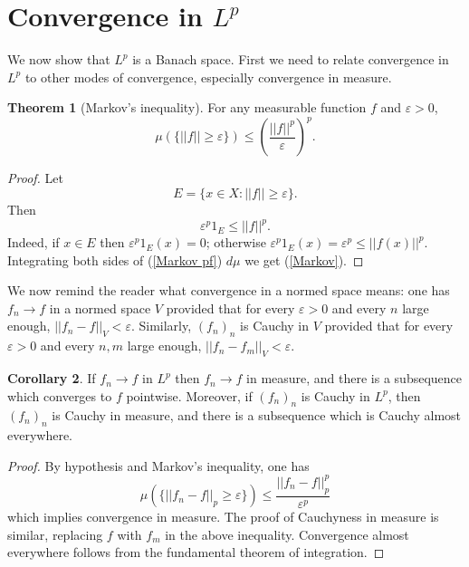 \documentclass[12pt]{book}
\theoremstyle{definition}
\newtheorem{theorem}{Theorem}[section]
\newtheorem{corollary}[theorem]{Corollary}
\begin{document}
\section{Convergence in $L^p$}
We now show that $L^p$ is a Banach space.
First we need to relate convergence in $L^p$ to other modes of convergence, especially convergence in measure.

\begin{theorem}[Markov's inequality]
For any measurable function $f$ and $\varepsilon > 0$,
\begin{equation}
\label{Markov}
\mu(\{||f|| \geq \varepsilon\}) \leq \left(\frac{||f||^p}{\varepsilon}\right)^p.
\end{equation}
\end{theorem}
\begin{proof}
Let
$$E = \{x \in X: ||f|| \geq \varepsilon\}.$$
Then
\begin{equation}
\label{Markov pf}
\varepsilon^p 1_E \leq ||f||^p.
\end{equation}
Indeed, if $x \in E$ then $\varepsilon^p 1_E(x) = 0$; otherwise $\varepsilon^p 1_E(x) = \varepsilon^p \leq ||f(x)||^p$.
Integrating both sides of (\ref{Markov pf}) $d\mu$ we get (\ref{Markov}).
\end{proof}

We now remind the reader what convergence in a normed space means: one has $f_n \to f$ in a normed space $V$ provided that for every $\varepsilon > 0$ and every $n$ large enough, $||f_n - f||_V < \varepsilon$.
Similarly, $(f_n)_n$ is Cauchy in $V$ provided that for every $\varepsilon > 0$ and every $n, m$ large enough, $||f_n - f_m||_V < \varepsilon$.

\begin{corollary}
If $f_n \to f$ in $L^p$ then $f_n \to f$ in measure, and there is a subsequence which converges to $f$ pointwise.
Moreover, if $(f_n)_n$ is Cauchy in $L^p$, then $(f_n)_n$ is Cauchy in measure, and there is a subsequence which is Cauchy almost everywhere.
\end{corollary}
\begin{proof}
By hypothesis and Markov's inequality, one has
$$\mu(\{||f_n - f||_p \geq \varepsilon\}) \leq \frac{||f_n - f||^p_p}{\varepsilon^p}$$
which implies convergence in measure.
The proof of Cauchyness in measure is similar, replacing $f$ with $f_m$ in the above inequality.
Convergence almost everywhere follows from the fundamental theorem of integration.
\end{proof}
\end{document}
